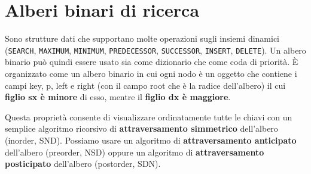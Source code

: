 \documentclass[11pt,a4paper]{article}
\begin{document}
\section{Alberi binari di ricerca}
Sono strutture dati che supportano molte operazioni sugli insiemi dinamici (\texttt{SEARCH}, \texttt{MAXIMUM}, \texttt{MINIMUM}, \texttt{PREDECESSOR}, \texttt{SUCCESSOR}, \texttt{INSERT}, \texttt{DELETE}). Un albero binario può quindi essere usato sia come dizionario che come coda di priorità.
È organizzato come un albero binario in cui ogni nodo è un oggetto che contiene i campi key, p, left e right
(con il campo root che è la radice dell’albero) il cui \textbf{figlio sx è minore} di esso, mentre il \textbf{figlio dx è maggiore}.

Questa proprietà consente di visualizzare ordinatamente tutte le chiavi con un semplice algoritmo ricorsivo
di \textbf{attraversamento simmetrico} dell’albero (inorder, SND). Possiamo usare un algoritmo di \textbf{attraversamento
anticipato} dell’albero (preorder, NSD) oppure un algoritmo di \textbf{attraversamento posticipato} dell’albero
(postorder, SDN).\medskip\\
%
\end{document}
